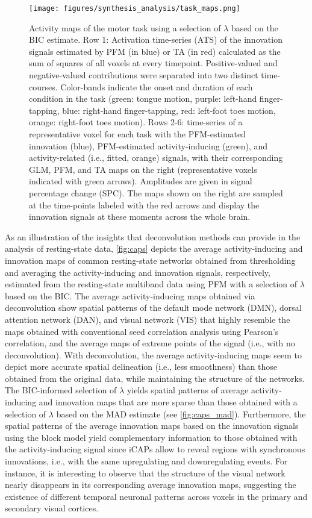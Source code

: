 \begin{figure}[t!]
    \begin{center}
        \texttt{[image: figures/synthesis\_analysis/task\_maps.png]}
    \end{center}
    \caption{Activity maps of the motor task using a selection of $\lambda$ based on the BIC estimate. Row 1: Activation time-series (ATS) of the innovation signals estimated by PFM (in blue) or TA (in red) calculated as the sum of squares of all voxels at every timepoint. Positive-valued and negative-valued contributions were separated into two distinct time-courses. Color-bands indicate the onset and duration of each condition in the task (green: tongue motion, purple: left-hand finger-tapping, blue: right-hand finger-tapping, red: left-foot toes motion, orange: right-foot toes motion). Rows 2-6: time-series of a representative voxel for each task with the PFM-estimated innovation (blue), PFM-estimated activity-inducing (green), and activity-related (i.e., fitted, orange) signals, with their corresponding GLM, PFM, and TA maps on the right (representative voxels indicated with green arrows). Amplitudes are given in signal percentage change (SPC). The maps shown on the right are sampled at the time-points labeled with the red arrows and display the innovation signals at these moments across the whole brain.}
\label{fig:task_maps}
\end{figure}

As an illustration of the insights that deconvolution methods can provide in the
analysis of resting-state data, \cref{fig:caps} depicts the average
activity-inducing and innovation maps of common resting-state networks obtained
from thresholding and averaging the activity-inducing and innovation signals,
respectively, estimated from the resting-state multiband data using PFM with a
selection of $\lambda$ based on the BIC. The average activity-inducing maps
obtained via deconvolution show spatial patterns of the default mode network
(DMN), dorsal attention network (DAN), and visual network (VIS) that
highly resemble the maps obtained with conventional seed correlation analysis
using Pearson's correlation, and the average maps of extreme points of the
signal (i.e., with no deconvolution). With deconvolution, the average
activity-inducing maps seem to depict more accurate spatial delineation (i.e.,
less smoothness) than those obtained from the original data, while maintaining
the structure of the networks. The BIC-informed selection of $\lambda$ yields
spatial patterns of average activity-inducing and innovation maps that are more
sparse than those obtained with a selection of $\lambda$ based on the MAD
estimate (see \cref{fig:caps_mad}). Furthermore, the spatial patterns of the
average innovation maps based on the innovation signals using the block model
yield complementary information to those obtained with the activity-inducing
signal since iCAPs allow to reveal regions with synchronous innovations, i.e.,
with the same upregulating and downregulating events. For instance, it is
interesting to observe that the structure of the visual network nearly
disappears in its corresponding average innovation maps, suggesting the
existence of different temporal neuronal patterns across voxels in the primary
and secondary visual cortices.

